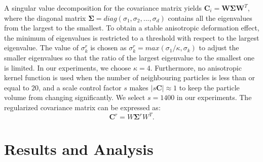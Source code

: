 \documentclass[times,twocolumn,final]{elsarticle}
\begin{document}
A singular value decomposition for the covariance matrix yields $\mathbf{C}_{i}=\mathbf{W} \mathbf{\Sigma} \mathbf{W}^{T}$, where the diagonal matrix $\mathbf{\Sigma} = diag(\sigma_1,\sigma_2,...,\sigma_d)$ contains all the eigenvalues from the largest to the smallest. To obtain a stable anisotropic deformation effect, the minimum of eigenvalues is restricted to a threshold with respect to the largest eigenvalue. The value of $\sigma_k^r$ is chosen as $\sigma_k^r=max(\sigma_1/\kappa,\sigma_k)$ to adjust the smaller eigenvalues so that the ratio of the largest eigenvalue to the smallest one is limited. In our experiments, we choose $\kappa=4$. Furthermore, no anisotropic kernel function is used when the number of neighbouring particles is less than or equal to $20$, and a scale control factor $s$ makes $|s \mathbf{C}| \approx 1$ to keep the particle volume from changing significantly. We select $s=1400$ in our experiments. The regularized covariance matrix can be expressed as:
\begin{equation}
\mathbf{C}^{r}=W \mathbf{\Sigma}^{r} W^{T}.
\end{equation}

\section{Results and Analysis}
\end{document}
